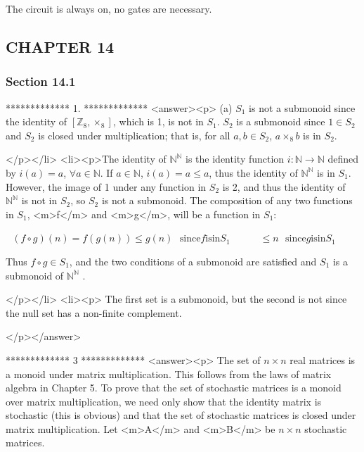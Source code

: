      The circuit is always on, no gates are necessary.


\subsection{CHAPTER 14}


\subsubsection{Section 14.1}

*************
1.
*************
<answer><p> (a) \(S_1\) is not a submonoid since the identity of \(\left[\mathbb{Z}_8 ,\times _8\right]\), which is 1, is not in \(S_1\).   \(S_2\) is a
submonoid since \(1 \in  S_2\) and \(S_2\) is closed under multiplication; that is, for all \(a, b \in  S_2\), \(a\times _8b\) is in \(S_2\).

</p></li>
<li><p>The identity of \(\mathbb{N}^{\mathbb{N}}\) is the identity function \(i:\mathbb{N}\to \mathbb{N}\) defined by \(i(a) = a\), \(\forall a\in \mathbb{N}\).
If \(a \in \mathbb{N}\), \(i(a) = a \leq  a\), thus the identity of \(\mathbb{N}^{\mathbb{N}}\) is in \(S_1\). However, the image of 1 under any
function in \(S_2\) is 2, and thus the identity of \(\mathbb{N}^{\mathbb{N}}\) is not in \(S_2\), so \(S_2\) is not a submonoid. The composition
of any two functions in \(S_1\),  <m>f</m> and <m>g</m>, will be a function in \(S_1\):



  \(\text{        }(f\circ g)(n)= f(g(n)) \leq g(n)\text{   }\text{since} f \text{is} \text{in} S_1\quad \quad \quad \leq n\text{    }\text{since}
g \text{is} \text{in} S_1\)



Thus \(f\circ g\in S_1\), and the two conditions of a submonoid are satisfied and \(S_1\) is a submonoid of  \(\mathbb{N}^{\mathbb{N}}\) .

</p></li>
<li><p>  The first set is a submonoid, but the second is not since the null set has a non-finite complement.

</p></answer>


*************
3
*************
<answer><p> The set of \(n \times  n\) real matrices is a monoid under matrix multiplication. This follows from the laws of matrix algebra in Chapter 5. To
prove that the set of stochastic matrices is a monoid over matrix multiplication, we need only show that the identity matrix is stochastic (this
is obvious) and that the set of stochastic matrices is closed under matrix multiplication. Let <m>A</m> and <m>B</m> be \(n \times  n\) stochastic
matrices.



